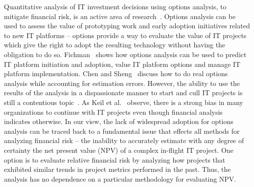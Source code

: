 Quantitative analysis of IT investment decisions using options analysis, to mitigate financial risk, is an active area of research~\cite{risk14,risk15,risk16}. Options analysis can be used to assess the value of prototyping work and early adoption initiatives related to new IT platforms -- options provide a way to evaluate the value of IT projects which give the right to adopt the resulting technology without having the obligation to do so. Fichman~\cite{risk14} shows how options analysis can be used to predict IT platform initiation and adoption, value IT platform options and manage IT platform implementation. Chen and Sheng~\cite{risk15} discuss how to do real options analysis while accounting for estimation errors. However, the ability to use the results of the analysis in a dispassionate manner to start and cull IT projects is still a contentious topic~\cite{risk17}. As Keil et al.~\cite{risk18} observe, there is a strong bias in many organizations to continue with IT projects even though financial analysis indicates otherwise. In our view, the lack of widespread adoption for options analysis can be traced back to a fundamental issue that effects all methods for analyzing financial risk -- the inability to accurately estimate with any degree of certainty the net present value (NPV) of a complex in-flight IT project. One option is to evaluate relative financial risk by analyzing how projects that exhibited similar trends in project metrics performed in the past. Thus, the analysis has no dependence on a particular methodology for evaluating NPV.

